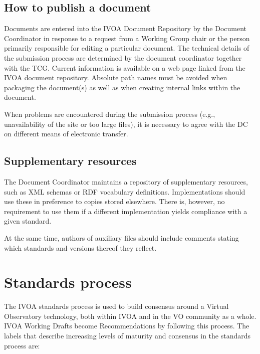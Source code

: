 \documentclass[11pt,a4paper]{ivoa}
\begin{document}
\subsection{How to publish a document}

Documents are entered into the IVOA Document Repository by the Document
Coordinator in response to a request from a Working Group chair or the
person primarily responsible for editing a particular document.  The
technical details of the submission process are determined by the
document coordinator together with the TCG. Current information is
available on a web page linked from the IVOA document repository.
Absolute path names must be avoided when packaging the document(s) as
well as when creating internal links within the document.

When problems are encountered during the submission process (e.g.,
unavailability of the site or too large files), it is necessary to agree
with the DC on different means of electronic transfer.

\subsection{Supplementary resources}

The Document Coordinator maintains a repository of supplementary
resources, such as XML schemas or RDF vocabulary definitions.
Implementations should use
these in preference to copies stored elsewhere.  There is, however, no
requirement to use them if a different implementation yields compliance
with a given standard.

At the same time, authors of auxiliary
files should include comments stating which standards and versions
thereof they reflect.


\section{Standards process}
\label{sect:proc}

The IVOA standards process is used to build consensus around a Virtual
Observatory technology, both within IVOA and in the VO community as a
whole. IVOA Working Drafts become Recommendations by following this
process. The labels that describe increasing levels of maturity and
consensus in the standards process are:
\end{document}
